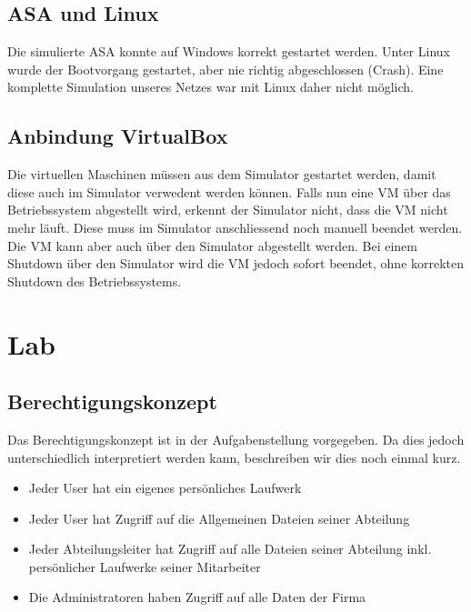 \documentclass[11pt,a4paper,parskip=half]{scrartcl}
\begin{document}
\subsection{ASA und Linux}
Die simulierte ASA konnte auf Windows korrekt gestartet werden. Unter Linux wurde der Bootvorgang gestartet, aber nie richtig abgeschlossen (Crash). Eine komplette Simulation unseres Netzes war mit Linux daher nicht möglich.
\subsection{Anbindung VirtualBox}
Die virtuellen Maschinen müssen aus dem Simulator gestartet werden, damit diese auch im Simulator verwedent werden können. Falls nun eine VM über das Betriebssystem abgestellt wird, erkennt der Simulator nicht, dass die VM nicht mehr läuft. Diese muss im Simulator anschliessend noch manuell beendet werden.\\
Die VM kann aber auch über den Simulator abgestellt werden. Bei einem Shutdown über den Simulator wird die VM jedoch sofort beendet, ohne korrekten Shutdown des Betriebssystems.

\section{Lab}
\subsection{Berechtigungskonzept}
Das Berechtigungskonzept ist in der Aufgabenstellung vorgegeben. Da dies jedoch unterschiedlich interpretiert werden kann, beschreiben wir dies noch einmal kurz.

\begin{itemize}
\item{Jeder User hat ein eigenes persönliches Laufwerk}
\item{Jeder User hat Zugriff auf die Allgemeinen Dateien seiner Abteilung}
\item{Jeder Abteilungsleiter hat Zugriff auf alle Dateien seiner Abteilung inkl. persönlicher Laufwerke seiner Mitarbeiter}
\item{Die Administratoren haben Zugriff auf alle Daten der Firma}
\end{itemize}
\end{document}
